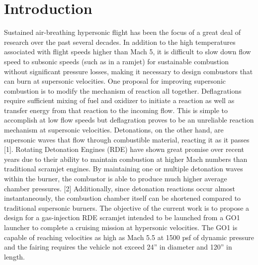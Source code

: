 \section{Introduction}
Sustained air-breathing hypersonic flight has been the focus of a great deal of research over the past several decades. In addition to the high temperatures associated with flight speeds higher than Mach 5, it is difficult to slow down flow speed to subsonic speeds (such as in a ramjet) for sustainable combustion without significant pressure losses, making it necessary to design combustors that can burn at supersonic velocities. One proposal for improving supersonic combustion is to modify the mechanism of reaction all together. Deflagrations require sufficient mixing of fuel and oxidizer to initiate a reaction as well as transfer energy from that reaction to the incoming flow. This is simple to accomplish at low flow speeds but deflagration proves to be an unreliable reaction mechanism at supersonic velocities. Detonations, on the other hand, are supersonic waves that flow through combustible material, reacting it as it passes [1]. Rotating Detonation Engines (RDE) have shown great promise over recent years due to their ability to maintain combustion at higher Mach numbers than traditional scramjet engines. By maintaining one or multiple detonation waves within the burner, the combustor is able to produce much higher average chamber pressures. [2] Additionally, since detonation reactions occur almost instantaneously, the combustion chamber itself can be shortened compared to traditional supersonic burners. The objective of the current work is to propose a design for a gas-injection RDE scramjet intended to be launched from a GO1 launcher to complete a cruising mission at hypersonic velocities. The GO1 is capable of reaching velocities as high as Mach 5.5 at 1500 psf of dynamic pressure and the fairing requires the vehicle not exceed 24” in diameter and 120” in length. 